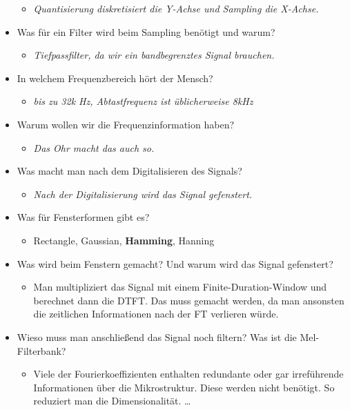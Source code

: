 \documentclass[11pt]{article}
\begin{document}
\begin{itemize}
\begin{itemize}
\item \emph{Quantisierung diskretisiert die Y-Achse und Sampling die X-Achse.}
\end{itemize}
\item Was für ein Filter wird beim Sampling benötigt und warum?
\begin{itemize}
\item \emph{Tiefpassfilter, da wir ein bandbegrenztes Signal brauchen.}
\end{itemize}
\item In welchem Frequenzbereich hört der Mensch?
\begin{itemize}
\item \emph{bis zu 32k Hz, Abtastfrequenz ist üblicherweise 8kHz}
\end{itemize}
\item Warum wollen wir die Frequenzinformation haben?
\begin{itemize}
\item \emph{Das Ohr macht das auch so.}
\end{itemize}
\item Was macht man nach dem Digitalisieren des Signals?
\begin{itemize}
\item \emph{Nach der Digitalisierung wird das Signal gefenstert.}
\end{itemize}
\item Was für Fensterformen gibt es?
\begin{itemize}
\item Rectangle, Gaussian, \textbf{Hamming}, Hanning
\end{itemize}
\item Was wird beim Fenstern gemacht? Und warum wird das Signal gefenstert?
\begin{itemize}
\item Man multipliziert das Signal mit einem Finite-Duration-Window und berechnet dann die DTFT. Das muss gemacht werden, da man ansonsten die zeitlichen Informationen nach der FT verlieren würde.
\end{itemize}
\item Wieso muss man anschließend das Signal noch filtern? Was ist die Mel-Filterbank? 
\begin{itemize}
\item Viele der Fourierkoeffizienten enthalten redundante oder gar irreführende Informationen über die Mikrostruktur. Diese werden nicht benötigt. So reduziert man die Dimensionalität. \dots

\end{itemize}
\end{itemize}
\end{document}
